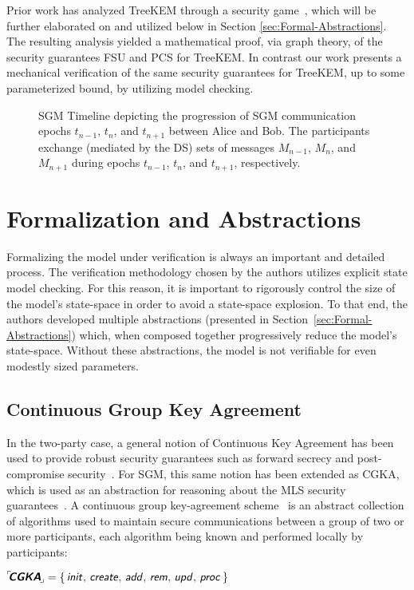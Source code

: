 \documentclass[runningheads]{llncs}
\newcommand{\Abrev}[1]{\gls{#1}}
\begin{document}
Prior work has analyzed TreeKEM through a security game~\cite{alwen2020security}, which will be further elaborated on and utilized below in Section \ref{sec:Formal-Abstractions}.
The resulting analysis yielded a mathematical proof, via graph theory, of the security guarantees \Abrev{FSU} and  \Abrev{PCS} for TreeKEM.
In contrast our work presents a mechanical verification of the same security guarantees for TreeKEM, up to some parameterized bound,  by utilizing model checking.



\begin{figure*}[ht!]
\centering
{}%
\caption{\Abrev{SGM} Timeline depicting the progression of \Abrev{SGM} communication epochs $t_{n-1}$, $t_{n}$, and $t_{n+1}$ between Alice and Bob. The participants exchange (mediated by the \Abrev{DS}) sets of messages $M_{n-1}$, $M_{n}$, and $M_{n+1}$ during epochs $t_{n-1}$, $t_{n}$, and $t_{n+1}$, respectively.}%
\label{fig:SGM-Timeline}%
\end{figure*}


\section{Formalization and Abstractions\label{sec:Formal-Abstractions}}

Formalizing the model under verification is always an important and detailed process.
The verification methodology chosen by the authors utilizes explicit state model checking.
For this reason, it is important to rigorously control the size of the model's state-space in order to avoid a state-space explosion. 
To that end, the authors developed multiple abstractions (presented in Section~\ref{sec:Formal-Abstractions}) which, when composed together progressively reduce the model's state-space. 
Without these abstractions, the model is not verifiable for even modestly sized parameters.

\subsection{Continuous Group Key Agreement}
In the two-party case, a general notion of Continuous Key Agreement has been used to provide robust security guarantees such as forward secrecy and post-compromise security~\cite{perrin2013axolotl,perrin2016double,alwen2019double}.
For \Abrev{SGM}, this same notion has been extended as \Abrev{CGKA}, which is used as an abstraction for reasoning about the \Abrev{MLS} security guarantees~\cite{alwen2020security}.
A continuous group key-agreement scheme \CGKAdef\ is an abstract collection of algorithms used to maintain secure communications between a group of two or more participants, each algorithm being known and performed locally by participants:\\[2mm]
\centerline{${}^{\ulcorner}\!\!\textbf{\textsf{\textsl{CGKA}}}_{\!\lrcorner} = \left\{\,\text{\sffamily{\textsl{init}}},\, \text{\sffamily{\textsl{create}}},\, \text{\sffamily{\textsl{add}}},\, \text{\sffamily{\textsl{rem}}},\, \text{\sffamily{\textsl{upd}}},\, \text{\sffamily{\textsl{proc}}}\,\right\}$}\\[-3mm]
\end{document}
